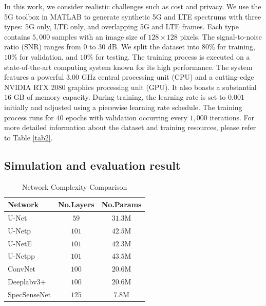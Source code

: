 \documentclass[journal]{IEEEtran} %
\begin{document}
In this work, we consider realistic challenges such as cost and privacy. We use the 5G toolbox in MATLAB to generate synthetic 5G and LTE spectrums with three types: 5G only, LTE only, and overlapping 5G and LTE frames. Each type contains $5,000$ samples with an image size of $128\times128$ pixels. The signal-to-noise ratio (SNR) ranges from $0$ to $30$ dB. We split the dataset into $80\%$ for training, $10\%$ for validation, and $10\%$ for testing.
The training process is executed on a state-of-the-art computing system known for its high performance. The system features a powerful $3.00$ GHz central processing unit (CPU) and a cutting-edge NVIDIA RTX 2080 graphics processing unit (GPU). It also boasts a substantial $16$ GB of memory capacity.
During training, the learning rate is set to $0.001$ initially and adjusted using a piecewise learning rate schedule. The training process runs for $40$ epochs with validation occurring every $1,000$ iterations.
For more detailed information about the dataset and training resources, please refer to Table \ref{tab2}.


\subsection{Simulation and evaluation result}

\begin{table}[!t]
\centering
\setlength{\tabcolsep}{8pt}
\caption{Network Complexity Comparison}
\label{tab1}
\begin{tabular}{l|c|c}
\hline
\textbf{Network} & \textbf{No.Layers} & \textbf{No.Params} \\
\hline
U-Net \cite{ronneberger2015u} & $59$ & $31.3$M \\
U-Netp \cite{zhou2019unet++} & $101$ & $42.5$M  \\
U-NetE \cite{zhou2019unet++} & $101$ & $42.3$M \\
U-Netpp  \cite{zhou2019unet++} & $101$ & $43.5$M  \\
ConvNet  \cite{huynhthe2023intelligence} & $100$ & $20.6$M \\
Deeplabv3+ \cite{nguyen2023accurate} & $100$ & $20.6$M  \\
SpecSenseNet & $125$ & $7.8$M \\
\hline
\end{tabular}
\end{table}
\end{document}
